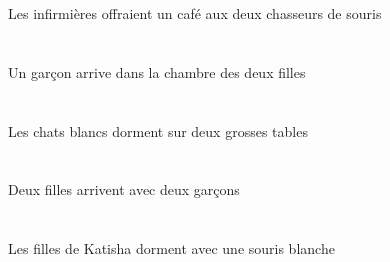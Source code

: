 \begin{exe}
Les infirmières offraient un café aux deux chasseurs de souris
\ex\glll
\INDSgAbs{}   \garconBSgAbs{}    \DEFSgObl{}    \DEFDuObl{}   \filleCDuObl{}   \DE{}   \chambreBSgObl{}   \DANS{}  \arriverViPrsBSg{}\\
\INDSgAbsP{}   \garconBSgAbsP{}    \DEFSgOblP{}    \DEFDuOblP{}   \filleCDuOblP{}   \DEP{}   \chambreBSgOblP{}   \DANSP{}  \arriverViPrsBSgP{}\\
\INDSgAbsG{}   \garconBSgAbsG{}    \DEFSgOblG{}    \DEFDuOblG{}   \filleCDuOblG{}   \DEG{}   \chambreBSgOblG{}   \DANSG{}  \arriverViPrsBSgG{}\\
Un garçon arrive dans la chambre des deux filles
\ex\glll
\INDDuObl{}   \grosCDu{}   \tableCDuObl{}   \SUR{}   \DEFPlAbs{}   \blancDPl{}   \chatDPlAbs{}  \dormirViPrsDPl{}\\
\INDDuOblP{}   \grosCDuP{}   \tableCDuOblP{}   \SURP{}   \DEFPlAbsP{}   \blancDPlP{}   \chatDPlAbsP{}  \dormirViPrsDPlP{}\\
\INDDuOblG{}   \grosCDuG{}   \tableCDuOblG{}   \SURG{}   \DEFPlAbsG{}   \blancDPlG{}   \chatDPlAbsG{}  \dormirViPrsDPlG{}\\
Les chats blancs dorment sur deux grosses tables
\ex\glll
\INDDuObl{}   \garconBDuObl{}   \AVEC{}   \INDDuAbs{}   \filleCDuAbs{}  \arriverViPrsCDu{}\\
\INDDuOblP{}   \garconBDuOblP{}   \AVECP{}   \INDDuAbsP{}   \filleCDuAbsP{}  \arriverViPrsCDuP{}\\
\INDDuOblG{}   \garconBDuOblG{}   \AVECG{}   \INDDuAbsG{}   \filleCDuAbsG{}  \arriverViPrsCDuG{}\\
Deux filles arrivent avec deux garçons
\ex\glll
\DEFPlAbs{}    \INDSgObl{}   \KatishaASgObl{}   \DE{}   \filleCPlAbs{}    \INDSgObl{}   \blancASg{}   \sourisASgObl{}   \AVEC{}  \dormirViPrsCPl{}\\
\DEFPlAbsP{}    \INDSgOblP{}   \KatishaASgOblP{}   \DEP{}   \filleCPlAbsP{}    \INDSgOblP{}   \blancASgP{}   \sourisASgOblP{}   \AVECP{}  \dormirViPrsCPlP{}\\
\DEFPlAbsG{}    \INDSgOblG{}   \KatishaASgOblG{}   \DEG{}   \filleCPlAbsG{}    \INDSgOblG{}   \blancASgG{}   \sourisASgOblG{}   \AVECG{}  \dormirViPrsCPlG{}\\
Les filles de Katisha dorment avec une souris blanche
\ex\glll
\INDDuAbs{}   \jauneADu{}   \coyoteADuAbs{}    \DEFSgObl{}   \grandCSg{}   \plaineCSgObl{}   \DANS{}  \arriverViPstADu{}\\
\INDDuAbsP{}   \jauneADuP{}   \coyoteADuAbsP{}    \DEFSgOblP{}   \grandCSgP{}   \plaineCSgOblP{}   \DANSP{}  \arriverViPstADuP{}\\

\end{exe}
